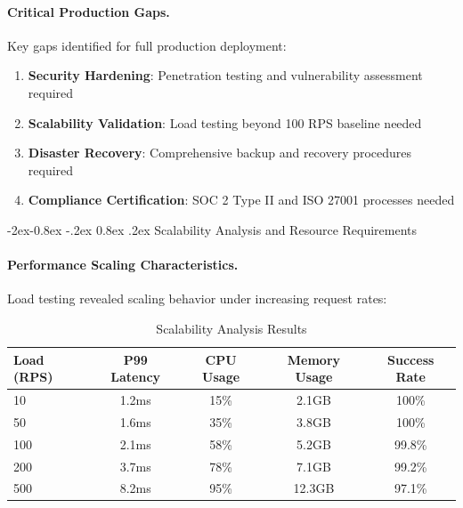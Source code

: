 \documentclass[manuscript,screen,9pt]{acmart}
\makeatletter
\renewcommand\subsubsection{\@startsection{subsubsection}{3}{\z@}%
  {-2ex\@plus -0.8ex \@minus -.2ex}%
  {0.8ex \@plus .2ex}%
  {\normalfont\normalsize\bfseries}}
\newcommand{\tablesize}{\footnotesize}
\newcommand{\tableheader}[1]{\textbf{#1}}
\makeatother
\begin{document}
\paragraph{Critical Production Gaps.}
Key gaps identified for full production deployment:
\begin{enumerate}[leftmargin=*,itemsep=1pt,parsep=1pt]
    \item \textbf{Security Hardening}: Penetration testing and vulnerability assessment required
    \item \textbf{Scalability Validation}: Load testing beyond 100 RPS baseline needed
    \item \textbf{Disaster Recovery}: Comprehensive backup and recovery procedures required
    \item \textbf{Compliance Certification}: SOC 2 Type II and ISO 27001 processes needed
\end{enumerate}

\subsubsection{Scalability Analysis and Resource Requirements}
\label{subsubsec:scalability_analysis}

\paragraph{Performance Scaling Characteristics.}
Load testing revealed scaling behavior under increasing request rates:

\begin{table}[!htb]
\centering
\caption{Scalability Analysis Results}
\label{tab:scalability_analysis}
\tablesize
\begin{tabular}{@{}lcccc@{}}
\toprule
\tableheader{Load (RPS)} & \tableheader{P99 Latency} & \tableheader{CPU Usage} & \tableheader{Memory Usage} & \tableheader{Success Rate} \\
\midrule
10 & 1.2ms & 15\% & 2.1GB & 100\% \\
50 & 1.6ms & 35\% & 3.8GB & 100\% \\
100 & 2.1ms & 58\% & 5.2GB & 99.8\% \\
200 & 3.7ms & 78\% & 7.1GB & 99.2\% \\
500 & 8.2ms & 95\% & 12.3GB & 97.1\% \\
\bottomrule
\end{tabular}
\end{table}
\end{document}
